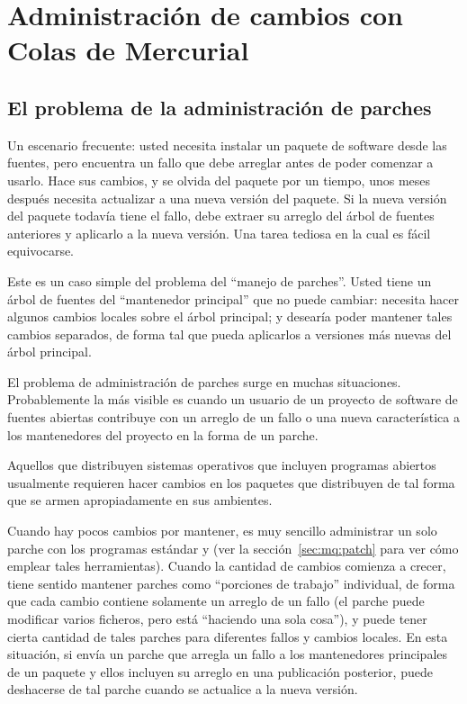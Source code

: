 \chapter{Administración de cambios con Colas de Mercurial}
\label{chap:mq}

\section{El problema de la administración de parches}
\label{sec:mq:patch-mgmt}

Un escenario frecuente: usted necesita instalar un paquete de software
desde las fuentes, pero encuentra un fallo que debe arreglar antes de
poder comenzar a usarlo.  Hace sus cambios, y se olvida del paquete
por un tiempo, unos meses después necesita actualizar a una nueva
versión del paquete.  Si la nueva versión del paquete todavía tiene el
fallo, debe extraer su arreglo del árbol de fuentes anteriores y
aplicarlo a la nueva versión.  Una tarea tediosa en la cual es fácil
equivocarse.

Este es un caso simple del problema del ``manejo de parches''.  Usted
tiene un árbol de fuentes del ``mantenedor principal'' que no puede
cambiar: necesita hacer algunos cambios locales sobre el árbol
principal; y desearía poder mantener tales cambios separados, de forma
tal que pueda aplicarlos a versiones más nuevas del árbol principal.

El problema de administración de parches surge en muchas situaciones.
Probablemente la más visible es cuando un usuario de un proyecto de
software de fuentes abiertas contribuye con un arreglo de un fallo o
una nueva característica a los mantenedores del proyecto en la forma
de un parche.

Aquellos que distribuyen sistemas operativos que incluyen programas
abiertos usualmente requieren hacer cambios en los paquetes que
distribuyen de tal forma que se armen apropiadamente en sus ambientes.

Cuando hay pocos cambios por mantener, es muy sencillo administrar un
solo parche con los programas estándar  y
 (ver la sección~\ref{sec:mq:patch} para ver cómo
emplear tales herramientas). Cuando la cantidad de cambios comienza a
crecer, tiene sentido mantener parches como ``porciones de trabajo''
individual, de forma que cada cambio contiene solamente un arreglo de
un fallo (el parche puede modificar varios ficheros, pero está
``haciendo una sola cosa''), y puede tener cierta cantidad de tales
parches para diferentes fallos y cambios locales.  En esta situación,
si envía un parche que arregla un fallo a los mantenedores principales
de un paquete y ellos incluyen su arreglo en una publicación
posterior, puede deshacerse de tal parche cuando se actualice a la
nueva versión.

